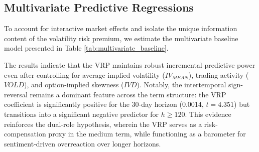 \documentclass[a4paper, 12pt]{article}    %
\begin{document}

\subsection{Multivariate Predictive Regressions}


To account for interactive market effects and isolate the unique information content of the volatility risk premium, we estimate the multivariate baseline model presented in Table \ref{tab:multivariate_baseline}.

The results indicate that the VRP maintains robust incremental predictive power even after controlling for average implied volatility ($IV_{MEAN}$), trading activity ($VOLD$), and option-implied skewness ($IVD$). Notably, the intertemporal sign-reversal remains a dominant feature across the term structure: the VRP coefficient is significantly positive for the 30-day horizon (0.0014, $t=4.351$) but transitions into a significant negative predictor for $h \ge 120$. This evidence reinforces the dual-role hypothesis, wherein the VRP serves as a risk-compensation proxy in the medium term, while functioning as a barometer for sentiment-driven overreaction over longer horizons. 
\end{document}
